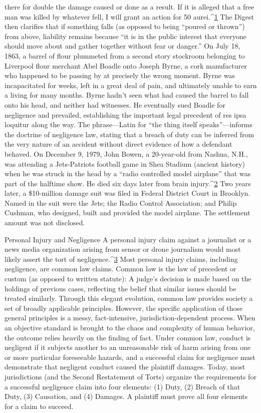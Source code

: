 there for double the damage caused or done as a result. If it is alleged
that a free man was killed by whatever fell, I will grant an action for
50 aurei.^{\href{#endnotes-sullivan}{1}}
The Digest then clarifies that if something falls (as opposed to being ``poured
or thrown'') from above, liability remains because ``it is in the public interest
that everyone should move about and gather together without fear
or danger.''
On July 18, 1863, a barrel of flour plummeted from a second story stockroom
belonging to Liverpool flour merchant Abel Boadle onto Joseph
Byrne, a cork manufacturer who happened to be passing by at precisely the
wrong moment. Byrne was incapacitated for weeks, left in a great deal of
pain, and ultimately unable to earn a living for many months. Byrne hadn't
seen what had caused the barrel to fall onto his head, and neither had witnesses.
He eventually sued Boadle for negligence and prevailed, establishing
the important legal precedent of res ipsa loquitur along the way. The
phrase—Latin for ``the thing itself speaks''—informs the doctrine of negligence
law, stating that a breach of duty can be inferred from the very nature
of an accident without direct evidence of how a defendant behaved.
On December 9, 1979, John Bowen, a 20-year-old from Nashua, N.H., was
attending a Jets-Patriots football game in Shea Stadium (ancient history)
when he was struck in the head by a ``radio controlled model airplane'' that
was part of the halftime show. He died six days later from brain injury.^{\href{#endnotes-sullivan}{2}} Two
years later, a \$10-million damage suit was filed in Federal District Court in
Brooklyn. Named in the suit were the Jets; the Radio Control Association;
and Philip Cushman, who designed, built and provided the model airplane.
The settlement amount was not disclosed.

Personal Injury and Negligence
A personal injury claim against a journalist or a news media organization
arising from sensor or drone journalism would most likely assert the tort of
negligence.^{\href{#endnotes-sullivan}{3}} Most personal injury claims, including negligence, are common
law claims. Common law is the law of precedent or custom (as opposed
to written statute): A judge's decision is made based on the holdings of previous
cases, reflecting the belief that similar issues should be treated similarly.
Through this elegant evolution, common law provides society a set of
broadly applicable principles. However, the specific application of those
general principles is a messy, fact-intensive, jurisdiction-dependent process.
When an objective standard is brought to the chaos and complexity of
human behavior, the outcome relies heavily on the finding of fact.
Under common law, conduct is negligent if it subjects another to an unreasonable
risk of harm arising from one or more particular foreseeable hazards,
and a successful claim for negligence must demonstrate that negligent
conduct caused the plaintiff damages. Today, most jurisdictions (and the
Second Restatement of Torts) organize the requirements for a successful
negligence claim into four elements: (1) Duty, (2) Breach of that Duty, (3)
Causation, and (4) Damages. A plaintiff must prove all four elements for a
claim to succeed.

